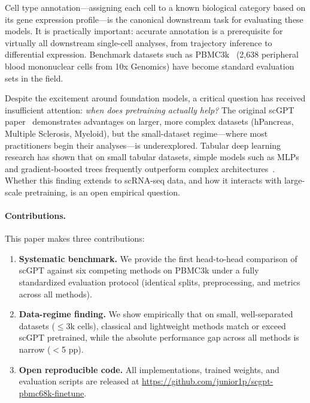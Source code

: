 \documentclass{article}
\begin{document}
Cell type annotation---assigning each cell to a known biological category based on its
gene expression profile---is the canonical downstream task for evaluating these models.
It is practically important: accurate annotation is a prerequisite for virtually all
downstream single-cell analyses, from trajectory inference to differential expression.
Benchmark datasets such as PBMC3k~\citep{zheng2017massively} (2,638 peripheral blood
mononuclear cells from 10x Genomics) have become standard evaluation sets in the field.

Despite the excitement around foundation models, a critical question has received
insufficient attention: \emph{when does pretraining actually help?} The original scGPT
paper~\citep{cui2024scgpt} demonstrates advantages on larger, more complex datasets
(hPancreas, Multiple Sclerosis, Myeloid), but the small-dataset regime---where most
practitioners begin their analyses---is underexplored. Tabular deep learning research
has shown that on small tabular datasets, simple models such as MLPs and gradient-boosted
trees frequently outperform complex architectures~\citep{grinsztajn2022tree}. Whether
this finding extends to scRNA-seq data, and how it interacts with large-scale pretraining,
is an open empirical question.

\paragraph{Contributions.} This paper makes three contributions:
\begin{enumerate}[leftmargin=*, itemsep=2pt]
  \item \textbf{Systematic benchmark.} We provide the first head-to-head comparison of
    scGPT against six competing methods on PBMC3k under a fully standardized evaluation
    protocol (identical splits, preprocessing, and metrics across all methods).
  \item \textbf{Data-regime finding.} We show empirically that on small, well-separated
    datasets ($\leq$3k cells), classical and lightweight methods match or exceed scGPT
    pretrained, while the absolute performance gap across all methods is narrow ($<$5 pp).
  \item \textbf{Open reproducible code.} All implementations, trained weights, and
    evaluation scripts are released at
    \url{https://github.com/junior1p/scgpt-pbmc68k-finetune}.
\end{enumerate}

\end{document}

